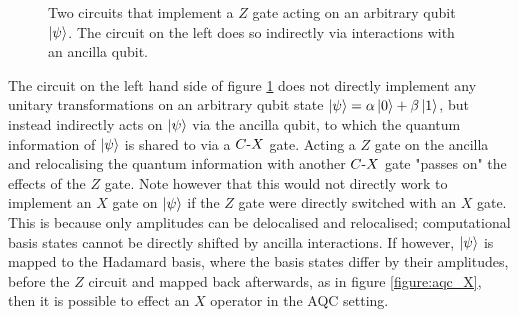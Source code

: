 \begin{figure}[h]
    \begin{center}
    \caption{Two circuits that implement a $Z$ gate acting on an arbitrary qubit $\ket{\psi}$. The circuit on the left does so indirectly via interactions with an ancilla qubit.}
    \label{figure:aqc_Z}
    \end{center}
\end{figure}
The circuit on the left hand side of figure \ref{figure:aqc_Z} does not directly implement any unitary transformations on an arbitrary qubit state $\ket{\psi} = \alpha \ket{0} + \beta \ket{1}$, but instead indirectly acts on $\ket{\psi}$ via the ancilla qubit, to which the quantum information of $\ket{\psi}$ is shared to via a $C\text{-}X$ gate.
Acting a $Z$ gate on the ancilla and relocalising the quantum information with another $C\text{-}X$ gate "passes on" the effects of the $Z$ gate.
Note however that this would not directly work to implement an $X$ gate on $\ket{\psi}$ if the $Z$ gate were directly switched with an $X$ gate.
This is because only amplitudes can be delocalised and relocalised; computational basis states cannot be directly shifted by ancilla interactions.
If however, $\ket{\psi}$ is mapped to the Hadamard basis, where the basis states differ by their amplitudes, before the $Z$ circuit and mapped back afterwards, as in figure \ref{figure:aqc_X}, then it is possible to effect an $X$ operator in the AQC setting.
